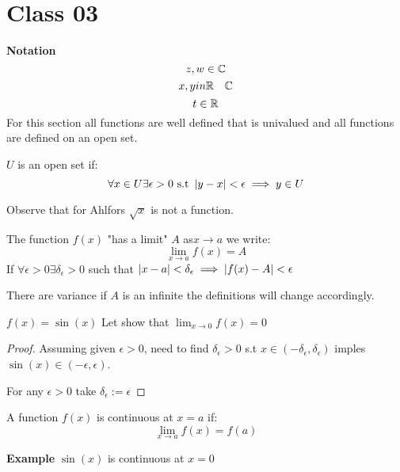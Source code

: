 \section{Class 03}
\textbf{Notation }
\[ z,w \in \mathbb{C} 	\]
\[ x,y in \mathbb{R} \quad  \mathbb{C} \]
\[ t \in \mathbb{R} \]
For this section all functions are well defined that is univalued and all functions are defined on an open set.
\begin{define}
$U$ is an open set if:
\[ \forall x \in U \exists \epsilon > 0 \textrm{ s.t } \left| y-x \right|  < \epsilon \implies y \in U \]
\end{define}
Observe that for Ahlfors $ \sqrt{x} $ is not a function.
\begin{define}
	The function $f(x)$ "has a limit" $A$ as$ x \rightarrow a$ we write:
	\[ \lim_{x \rightarrow a} f(x) = A  \]
	If $ \forall \epsilon > 0 \exists \delta_{\epsilon} > 0$ such that $ \left| x - a \right| < \delta_\epsilon \implies \left|  f(x) - A \right| < \epsilon $
\end{define}
There are variance if $A$ is an infinite the definitions will change accordingly.
\begin{lem}
	$f(x) = \sin(x)$ Let show that $ \lim_{x \rightarrow 0 } f(x) = 0$
\end{lem}
\begin{proof}
	Assuming given $ \epsilon > 0 $, need to find $ \delta_\epsilon > 0 $ s.t $ x \in (-\delta_\epsilon, \delta_\epsilon) $ imples $\sin(x) \in (-\epsilon,\epsilon) $. 
	
	For any $ \epsilon > 0 $ take $ \delta_\epsilon := \epsilon $ 
\end{proof}
\begin{define}
	A function $f(x)$ is continuous at $ x =a $ if:
	\[ \lim_{x \rightarrow a} f(x) = f(a) \]
\end{define}

\textbf{Example }
$ \sin(x) $ is continuous at $ x = 0 $

